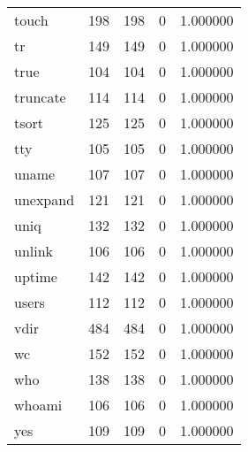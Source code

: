 \begin{tabular}{lrrrr}
touch     &                     198 &              198 &                 0 &                     1.000000 \\
tr        &                     149 &              149 &                 0 &                     1.000000 \\
true      &                     104 &              104 &                 0 &                     1.000000 \\
truncate  &                     114 &              114 &                 0 &                     1.000000 \\
tsort     &                     125 &              125 &                 0 &                     1.000000 \\
tty       &                     105 &              105 &                 0 &                     1.000000 \\
uname     &                     107 &              107 &                 0 &                     1.000000 \\
unexpand  &                     121 &              121 &                 0 &                     1.000000 \\
uniq      &                     132 &              132 &                 0 &                     1.000000 \\
unlink    &                     106 &              106 &                 0 &                     1.000000 \\
uptime    &                     142 &              142 &                 0 &                     1.000000 \\
users     &                     112 &              112 &                 0 &                     1.000000 \\
vdir      &                     484 &              484 &                 0 &                     1.000000 \\
wc        &                     152 &              152 &                 0 &                     1.000000 \\
who       &                     138 &              138 &                 0 &                     1.000000 \\
whoami    &                     106 &              106 &                 0 &                     1.000000 \\
yes       &                     109 &              109 &                 0 &                     1.000000 \\
\bottomrule
\end{tabular}
